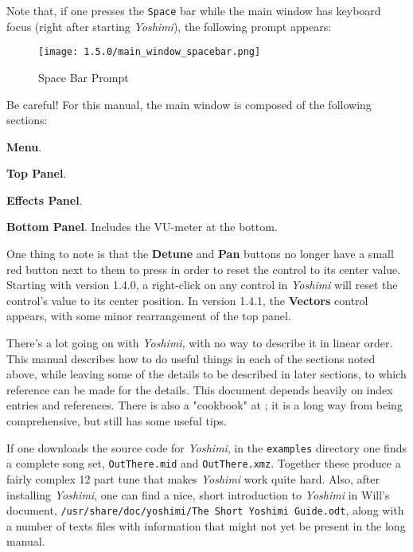 \documentclass[
 11pt,
 twoside,
 a4paper,
 final                                 %
]{article}
\begin{document}
   Note that, if one presses the \texttt{Space} bar while the main window has
   keyboard focus (right after starting \textsl{Yoshimi}), the following prompt
   appears:

\begin{figure}[H]
   \centering
   \texttt{[image: 1.5.0/main\_window\_spacebar.png]}
   \caption{Space Bar Prompt}
   \label{fig:yoshimi_main_spacebar_prompt}
\end{figure}

   Be careful!
   For this manual, the main window is composed of the following sections:

\begin{enumber}
   \item \textbf{Menu}.
   \item \textbf{Top Panel}.
   \item \textbf{Effects Panel}.
   \item \textbf{Bottom Panel}.  Includes the VU-meter at the bottom.
\end{enumber}

   One thing to note is that the \textbf{Detune} and \textbf{Pan} buttons no
   longer have a small red button next to them to press in order to reset the
   control to its center value.  Starting with version 1.4.0, a right-click on
   any control in \textsl{Yoshimi} will reset the control's value to its center
   position.  In version 1.4.1, the \textbf{Vectors} control appears, with some
   minor rearrangement of the top panel.

   There's a lot going on with \textsl{Yoshimi}, with no way to describe
   it in linear order.  This manual describes how to do useful things in
   each of the sections noted above, while leaving some of the details to be
   described in later sections, to which reference can be made for the details.
   This document depends heavily on index entries and references.
   There is also a "cookbook" at \cite{book}; it is a long way from being
   comprehensive, but still has some useful tips.

   If one downloads the source code for \textsl{Yoshimi}, in the
   \texttt{examples} directory one finds a complete song set,
   \texttt{OutThere.mid} and \texttt{OutThere.xmz}. Together these produce a
   fairly complex 12 part tune that makes \textsl{Yoshimi} work quite hard.
   Also, after installing \textsl{Yoshimi}, one can find a nice, short
   introduction to \textsl{Yoshimi} in Will's document,
   \texttt{/usr/share/doc/yoshimi/The Short Yoshimi Guide.odt},
   along with a number of texts files with information that might not yet be
   present in the long manual.
\end{document}

